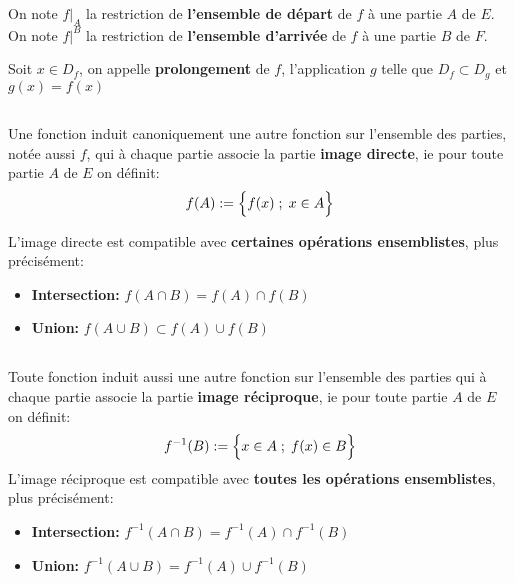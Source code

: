 On note \(f|_A\) la restriction de \textbf{l'ensemble de départ} de \(f\) à une partie \(A\) de \(E\).\+
On note \(f|^B\) la restriction de \textbf{l'ensemble d'arrivée} de \(f\) à une partie \(B\) de \(F\).\<

Soit \(x \in D_f\), on appelle \textbf{prolongement} de \(f\), l'application \(g\) telle que \(D_f \subset D_g\) et \(g(x) = f(x)\)
\subsection*{}

Une fonction induit canoniquement une autre fonction sur l'ensemble des parties, notée aussi \( f \), qui à chaque partie associe la partie \textbf{image directe}, ie pour toute partie \(A\) de \(E\) on définit:
\[
    f(A) := \Bigl\{ f(x) \; ; \; x \in A \Bigl\}
\]

L'image directe est compatible avec \textbf{certaines opérations ensemblistes}, plus précisément:
\begin{itemize}
    \item \textbf{Intersection:} \(f(A \cap B) = f(A) \cap f(B)\)
    \item \textbf{Union:} \(f(A \cup B) \subset f(A) \cup f(B)\)
\end{itemize}
\subsection*{}
Toute fonction induit aussi une autre fonction sur l'ensemble des parties qui à chaque partie associe la partie \textbf{image réciproque}, ie pour toute partie \(A\) de \(E\) on définit:
\[
    f^{-1}(B) := \Bigl\{ x \in A \; ; \; f(x) \in B \Bigl\} 
\]
L'image réciproque est compatible avec \textbf{toutes les opérations ensemblistes}, plus précisément:
\begin{itemize}
    \item \textbf{Intersection:} \(f^{-1}(A \cap B) = f^{-1}(A) \cap f^{-1}(B)\)
    \item \textbf{Union:} \(f^{-1}(A \cup B) = f^{-1}(A) \cup f^{-1}(B)\)
\end{itemize}
\subsection*{}

